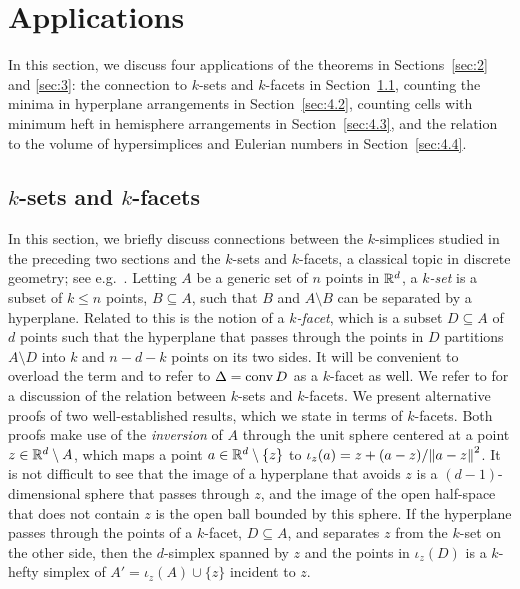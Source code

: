\documentclass[a4paper,UKenglish,cleveref, autoref,numberwithinsect]{socg-lipics-v2021}
\newcommand {\mm}[1] {\ifmmode{#1}\else{\mbox{\(#1\)}}\fi}
\theoremstyle{plain}
\newcommand{\Rspace}        {\mm{{\mathbb R}}}
\newcommand{\conv}[1]       {\mm{{\rm conv\,}{#1}}}
\newcommand{\Edist}[2]      {\mm{\|{#1}-{#2}\|}}
\begin{document}
\section{Applications}
\label{sec:4}
In this section, we discuss four applications of the theorems in Sections~\ref{sec:2} and \ref{sec:3}:
the connection to $k$-sets and $k$-facets in Section~\ref{sec:4.1}, counting the minima in hyperplane arrangements in Section~\ref{sec:4.2}, counting cells with minimum heft in hemisphere arrangements in Section~\ref{sec:4.3}, and the relation to the volume of hypersimplices and Eulerian numbers in Section~\ref{sec:4.4}.
\subsection{$k$-sets and $k$-facets}
\label{sec:4.1}
In this section, we briefly discuss connections between the $k$-simplices studied in the preceding two sections and the $k$-sets and $k$-facets, a classical topic in discrete geometry; see e.g.\ \cite[Chapter~11]{Mat02}.
Letting $A$ be a generic set of $n$ points in $\Rspace^d$, a \emph{$k$-set} is a subset of $k \leq n$ points, $B \subseteq A$, such that $B$ and $A \setminus B$ can be separated by a hyperplane.
Related to this is the notion of a \emph{$k$-facet}, which is a subset $D \subseteq A$ of $d$ points such that the hyperplane that passes through the points in $D$ partitions $A \setminus D$ into $k$ and $n-d-k$ points on its two sides.
It will be convenient to overload the term and to refer to $\Delta = \conv{D}$ as a $k$-facet as well.
We refer to \cite[Section~2.2]{Wag08} for a discussion of the relation between $k$-sets and $k$-facets.
\smallskip
We present alternative proofs of two well-established results, which we state in terms of $k$-facets.
Both proofs make use of the \emph{inversion} of $A$ through the unit sphere centered at a point $z \in \Rspace^d \setminus A$, which maps a point $a \in \Rspace^d \setminus \{z\}$ to $\iota_z (a) = z + (a-z)/\Edist{a}{z}^2$.
It is not difficult to see that the image of a hyperplane that avoids $z$ is a $(d-1)$-dimensional sphere that passes through $z$, and the image of the open half-space that does not contain $z$ is the open ball bounded by this sphere.
If the hyperplane passes through the points of a $k$-facet, $D \subseteq A$, and separates $z$ from the $k$-set on the other side, then the $d$-simplex spanned by $z$ and the points in $\iota_z (D)$ is a $k$-hefty simplex of $A' = \iota_z (A) \cup \{z\}$ incident to $z$.
\end{document}
